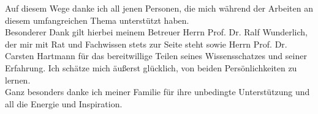 \cleardoublepage


\begin{acknowledgements}


Auf diesem Wege danke ich all jenen Personen, die mich während der Arbeiten an diesem umfangreichen Thema unterstützt haben. \\

Besonderer Dank gilt hierbei meinem Betreuer Herrn Prof. Dr. Ralf Wunderlich, der mir mit Rat und Fachwissen stets zur Seite steht 
sowie Herrn Prof. Dr. Carsten Hartmann für das bereitwillige Teilen seines Wissensschatzes und seiner Erfahrung. 
Ich schätze mich äußerst glücklich, von beiden Persönlichkeiten zu lernen. \\

Ganz besonders danke ich meiner Familie für ihre unbedingte Unterstützung und all die Energie und Inspiration.





\end{acknowledgements}